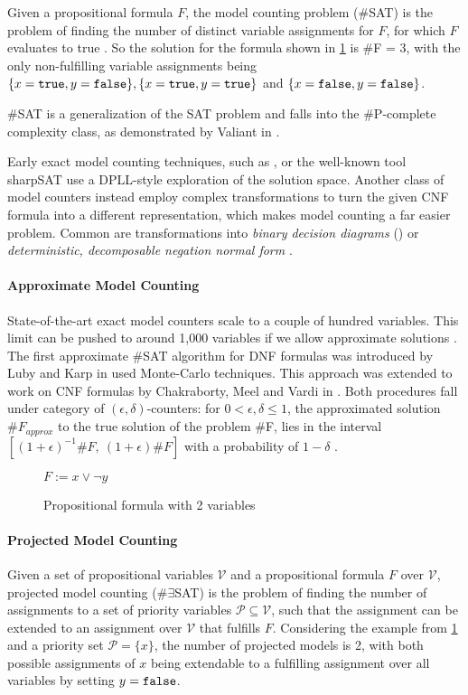 Given a propositional formula $F$, the model counting problem (\#SAT) is the problem of finding the number of distinct variable assignments for $F$, for which $F$ evaluates to true \cite{biere09}. So the solution for the formula shown in  \ref{fig:satEx} is \#F = 3, with the only non-fulfilling variable assignments being $\{ x = \mathtt{true}, y = \mathtt{false}\}, \{x = \mathtt{true}, y = \mathtt{true}\}$ and  $\{x = \mathtt{false}, y = \mathtt{false}\}$.

\#SAT is a generalization of the SAT problem and falls into the \#P-complete complexity class, as demonstrated by Valiant in \cite{valiant79}.

Early exact model counting techniques, such as \cite{birnbaum99}, or the well-known tool sharpSAT \cite{thurley06} use a DPLL-style exploration of the solution space. Another class of model counters instead employ complex transformations to turn the given CNF formula into a different representation, which makes model counting a far easier problem. Common are transformations into \emph{binary decision diagrams} () or \emph{deterministic, decomposable negation normal form} \cite{darwiche04}.

\paragraph*{Approximate Model Counting}
State-of-the-art exact model counters scale to a couple of hundred variables.  This limit can be pushed to around 1,000 variables if we allow approximate solutions \cite{biere09}.
The first approximate \#SAT algorithm for DNF formulas was introduced by Luby and Karp in \cite{karp89} used Monte-Carlo techniques. This approach was extended to work on CNF formulas by Chakraborty, Meel and Vardi in \cite{chakraborty13}. Both procedures fall under category of $(\epsilon, \delta)$-counters: for $0 < \epsilon, \delta \leq 1$, the approximated solution $\#F_{approx}$ to the true solution of the problem \#F, lies in the interval $[(1 + \epsilon)^{-1} \#F, \: (1 + \epsilon) \#F]$ with a probability of $1 - \delta$ \cite{karp89,chakraborty13}.

\begin{figure}
    \centering
    $F := x \lor \lnot y$
    \caption{Propositional formula with 2 variables}
    \label{fig:satEx}
\end{figure}



\paragraph*{Projected Model Counting}
Given a set of propositional variables $\mathcal{V}$ and a propositional formula $F$ over $\mathcal{V}$, projected model counting (\#$\exists$SAT) is the problem of finding the number of assignments to a set of priority variables $\mathcal{P} \subseteq \mathcal{V}$, such that the assignment can be extended to an assignment over $\mathcal{V}$ that fulfills $F$. Considering the example from \ref{fig:satEx} and a priority set $\mathcal{P} = \{x\}$, the number of projected models is 2, with both possible assignments of $x$ being extendable to a fulfilling assignment over all variables by setting $y = \mathtt{false}$.

